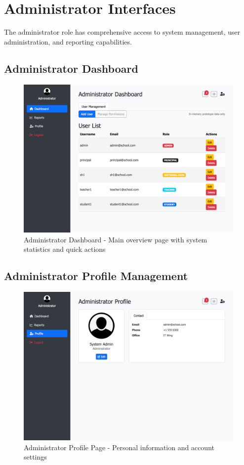 \documentclass[12pt,a4paper]{article}
\begin{document}
\section{Administrator Interfaces}

The administrator role has comprehensive access to system management, user administration, and reporting capabilities.

\subsection{Administrator Dashboard}
\begin{figure}[H]
    \centering
    \includegraphics[width=\textwidth]{admin/admin-dashboard-page.png}
    \caption{Administrator Dashboard - Main overview page with system statistics and quick actions}
    \label{fig:admin-dashboard}
\end{figure}

\subsection{Administrator Profile Management}
\begin{figure}[H]
    \centering
    \includegraphics[width=\textwidth]{admin/admin-profile-page.png}
    \caption{Administrator Profile Page - Personal information and account settings}
    \label{fig:admin-profile}
\end{figure}
\end{document}
